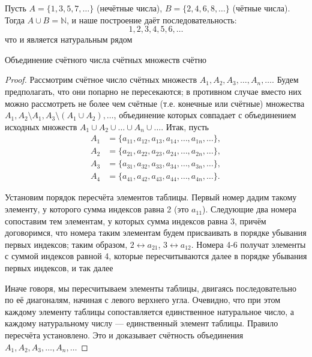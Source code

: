 \documentclass[a4paper,12pt]{article}
\theoremstyle{definition}
\theoremstyle{plain}
\theoremstyle{remark}
\begin{document}
	\begin{tcolorbox}[colback=yellow!5, colframe=orange!60!black, title=Пример к предложению 2]
		Пусть $A = \{1, 3, 5, 7, \dots\}$ (нечётные числа), $B = \{2, 4, 6, 8, \dots\}$ (чётные числа). Тогда $A \cup B = \mathbb{N}$, и наше построение даёт последовательность:
		\[
		1, 2, 3, 4, 5, 6, \dots
		\]
		что и является натуральным рядом
	\end{tcolorbox}
	
	
	
	\bigskip
	\begin{tcolorbox}[colback=red!5, colframe=red!70!black, title=Теорема 1]
		Объединение счётного числа счётных множеств счётно
	\end{tcolorbox}
	
	\medskip
	\begin{proof}
		Рассмотрим счётное число счётных множеств $A_1, A_2, A_3, \dots, A_n, \dots$. Будем предполагать, что они попарно не пересекаются; в противном случае вместо них можно рассмотреть не более чем счётные (т.е. конечные или счётные) множества
		$A_1, A_2 \setminus A_1, A_3 \setminus (A_1 \cup A_2), \dots$, объединение которых совпадает с объединением исходных множеств $A_1 \cup A_2 \cup \dots \cup A_n \cup \dots$. Итак, пусть
		\begin{align*}
			A_1 &= \{a_{11}, a_{12}, a_{13}, a_{14}, \dots, a_{1n}, \dots\}, \\
			A_2 &= \{a_{21}, a_{22}, a_{23}, a_{24}, \dots, a_{2n}, \dots\}, \\
			A_3 &= \{a_{31}, a_{32}, a_{33}, a_{34}, \dots, a_{3n}, \dots\}, \\
			A_4 &= \{a_{41}, a_{42}, a_{43}, a_{44}, \dots, a_{4n}, \dots\}.
		\end{align*}
		
		Установим порядок пересчёта элементов таблицы. Первый номер дадим такому элементу, у которого сумма индексов равна 2 (это $a_{11}$).
		Следующие два номера сопоставим тем элементам, у которых сумма индексов равна 3, причём договоримся, что номера таким элементам будем присваивать в порядке убывания первых индексов; таким образом, $2 \leftrightarrow a_{21}$, $3 \leftrightarrow a_{12}$.
		Номера 4-6 получат элементы с суммой индексов равной 4, которые пересчитываются далее в порядке убывания первых индексов, и так далее
		
		\medskip
		Иначе говоря, мы пересчитываем элементы таблицы, двигаясь последовательно по её диагоналям, начиная с левого верхнего угла. Очевидно, что при этом каждому элементу таблицы сопоставляется единственное натуральное число, а каждому натуральному числу — единственный элемент таблицы. Правило пересчёта установлено. Это и доказывает счётность объединения $A_1, A_2, A_3, \dots, A_n, \dots$
	\end{proof}
	
\end{document}
